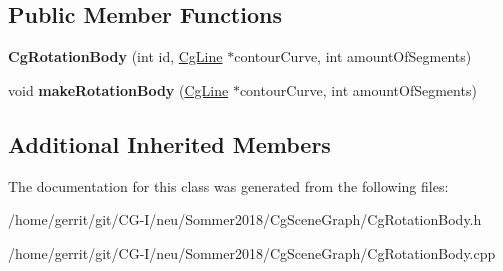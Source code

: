 \subsection*{Public Member Functions}
\begin{DoxyCompactItemize}
\item 
\mbox{\label{class_cg_rotation_body_a63166491c4c685d1f3867c559a4e86e0}} 
{\bfseries Cg\+Rotation\+Body} (int id, \hyperlink{class_cg_line}{Cg\+Line} $\ast$contour\+Curve, int amount\+Of\+Segments)
\item 
\mbox{\label{class_cg_rotation_body_a861fcc537fd427f6e2a8cd04a2d74a90}} 
void {\bfseries make\+Rotation\+Body} (\hyperlink{class_cg_line}{Cg\+Line} $\ast$contour\+Curve, int amount\+Of\+Segments)
\end{DoxyCompactItemize}
\subsection*{Additional Inherited Members}


The documentation for this class was generated from the following files\+:\begin{DoxyCompactItemize}
\item 
/home/gerrit/git/\+C\+G-\/\+I/neu/\+Sommer2018/\+Cg\+Scene\+Graph/Cg\+Rotation\+Body.\+h\item 
/home/gerrit/git/\+C\+G-\/\+I/neu/\+Sommer2018/\+Cg\+Scene\+Graph/Cg\+Rotation\+Body.\+cpp\end{DoxyCompactItemize}
